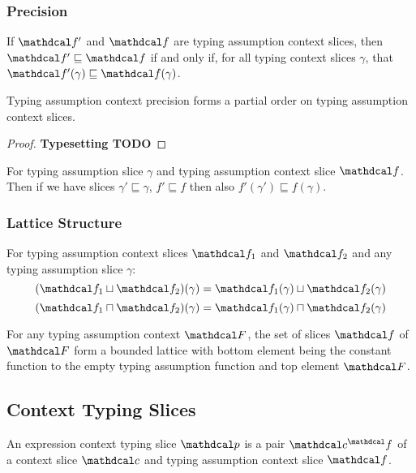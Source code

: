 \subsubsection{Precision}
\begin{definition}\label{def:FunctionPrecision}
If $\f'$ and $\f$ are typing assumption context slices, then $\f' \sqsubseteq \f$ if and only if, for all typing context slices $\gamma$, that $\f'(\gamma) \sqsubseteq \f(\gamma)$.
\end{definition}
\begin{proposition}
Typing assumption context precision forms a partial order on typing assumption context slices.
\end{proposition}
\begin{proof}
\textbf{Typesetting TODO}
\end{proof}
\begin{conjecture}
For typing assumption slice $\gamma$ and typing assumption context slice $\f$. Then if we have slices $\gamma' \sqsubseteq \gamma$, $f' \sqsubseteq f$ then also $f'(\gamma') \sqsubseteq f(\gamma)$.
\end{conjecture}

\subsubsection{Lattice Structure}
\begin{definition} For typing assumption context slices $\f_1$ and $\f_2$ and any typing assumption slice $\gamma$:
\[(\f_1 \sqcup \f_2)(\gamma) = \f_1(\gamma) \sqcup \f_2(\gamma)\]
\[(\f_1 \sqcap \f_2)(\gamma) = \f_1(\gamma) \sqcap \f_2(\gamma)\]
\end{definition}

\begin{conjecture}
For any typing assumption context $\F$, the set of slices $\f$ of $\F$ form a bounded lattice with bottom element being the constant function to the empty typing assumption function and top element $\F$.
\end{conjecture}

\subsection{Context Typing Slices}
\begin{definition}
An expression context typing slice $\p$ is a pair $\Cs^\f$ of a context slice $\Cs$ and typing assumption context slice $\f$.
\end{definition}
